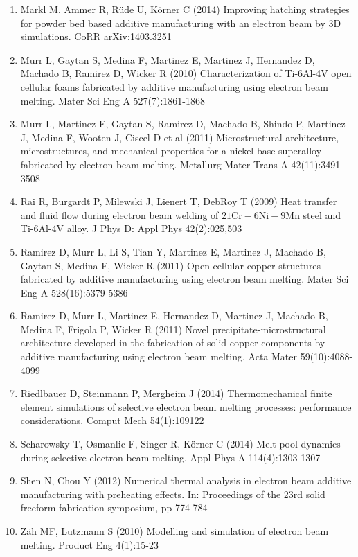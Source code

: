 \documentclass[10pt]{article}
\begin{document}
\begin{enumerate}
  \item Markl M, Ammer R, Rüde U, Körner C (2014) Improving hatching strategies for powder bed based additive manufacturing with an electron beam by 3D simulations. CoRR arXiv:1403.3251

  \item Murr L, Gaytan S, Medina F, Martinez E, Martinez J, Hernandez D, Machado B, Ramirez D, Wicker R (2010) Characterization of Ti-6Al-4V open cellular foams fabricated by additive manufacturing using electron beam melting. Mater Sci Eng A 527(7):1861-1868

  \item Murr L, Martinez E, Gaytan S, Ramirez D, Machado B, Shindo P, Martinez J, Medina F, Wooten J, Ciscel D et al (2011) Microstructural architecture, microstructures, and mechanical properties for a nickel-base superalloy fabricated by electron beam melting. Metallurg Mater Trans A 42(11):3491-3508

  \item Rai R, Burgardt P, Milewski J, Lienert T, DebRoy T (2009) Heat transfer and fluid flow during electron beam welding of $21 \mathrm{Cr}-6 \mathrm{Ni}-9 \mathrm{Mn}$ steel and Ti-6Al-4V alloy. J Phys D: Appl Phys 42(2):025,503

  \item Ramirez D, Murr L, Li S, Tian Y, Martinez E, Martinez J, Machado B, Gaytan S, Medina F, Wicker R (2011) Open-cellular copper structures fabricated by additive manufacturing using electron beam melting. Mater Sci Eng A 528(16):5379-5386

  \item Ramirez D, Murr L, Martinez E, Hernandez D, Martinez J, Machado B, Medina F, Frigola P, Wicker R (2011) Novel precipitate-microstructural architecture developed in the fabrication of solid copper components by additive manufacturing using electron beam melting. Acta Mater 59(10):4088-4099

  \item Riedlbauer D, Steinmann P, Mergheim J (2014) Thermomechanical finite element simulations of selective electron beam melting processes: performance considerations. Comput Mech 54(1):109122

  \item Scharowsky T, Osmanlic F, Singer R, Körner C (2014) Melt pool dynamics during selective electron beam melting. Appl Phys A 114(4):1303-1307

  \item Shen N, Chou Y (2012) Numerical thermal analysis in electron beam additive manufacturing with preheating effects. In: Proceedings of the 23rd solid freeform fabrication symposium, pp 774-784

  \item Zäh MF, Lutzmann S (2010) Modelling and simulation of electron beam melting. Product Eng 4(1):15-23

\end{enumerate}
\end{document}
